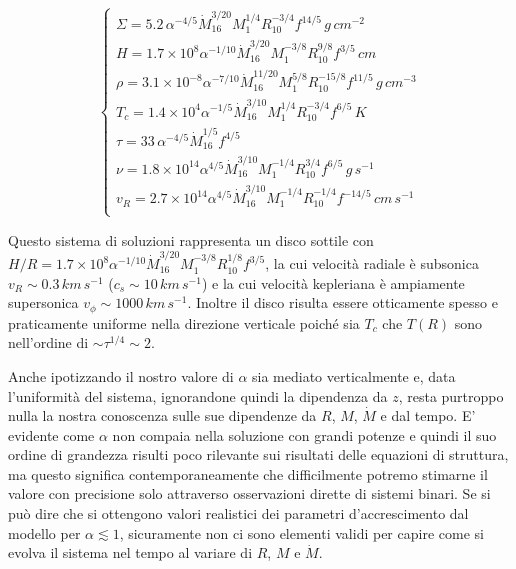 \documentclass[a4paperbi]{article}
\begin{document}
\begin{spacing}{1.3}
\begin{equation}
	\begin{cases}
		\Sigma=5.2\,\alpha^{-4/5}\dot{M}_{16}^{3/20}M^{1/4}_1R_{10}^{-3/4}f^{14/5}\,g\,cm^{-2}\\
		H=1.7\times10^8\alpha^{-1/10}\dot{M}^{3/20}_{16}M^{-3/8}_1R_{10}^{9/8}f^{3/5}\,cm\\
		\rho=3.1\times10^{-8}\alpha^{-7/10}\dot{M}^{11/20}_{16}M^{5/8}_1R_{10}^{-15/8}f^{11/5}\,g\,cm^{-3}\\
		T_c=1.4\times10^{4}\alpha^{-1/5}\dot{M}^{3/10}_{16}M^{1/4}_1R_{10}^{-3/4}f^{6/5}\,K\\
		\tau=33\,\alpha^{-4/5}\dot{M}^{1/5}_{16}f^{4/5}\\
		\nu=1.8\times10^{14}\alpha^{4/5}\dot{M}^{3/10}_{16}M^{-1/4}_1R_{10}^{3/4}f^{6/5}\,g\,s^{-1}\\
		v_R=2.7\times10^{14}\alpha^{4/5}\dot{M}^{3/10}_{16}M^{-1/4}_1R_{10}^{-1/4}f^{-14/5}\,cm\,s^{-1}\\
	\end{cases}
\end{equation}
\end{spacing}

	Questo sistema di soluzioni rappresenta un disco sottile con \\$H/R=1.7\times10^8\alpha^{-1/10}\dot{M}^{3/20}_{16}M^{-3/8}_1R_{10}^{1/8}f^{3/5}$, la cui velocità radiale è subsonica $v_R\sim 0.3\,km\,s^{-1}$ ($c_s\sim10\,km\,s^{-1}$) e la cui velocità kepleriana è ampiamente supersonica $v_\phi\sim1000\,km\,s^{-1}$. Inoltre il disco risulta essere otticamente spesso e praticamente uniforme nella direzione verticale poiché sia $T_c$ che $T(R)$ sono nell'ordine di $\sim\tau^{1/4}\sim2$.

	Anche ipotizzando il nostro valore di $\alpha$ sia mediato verticalmente e, data l'uniformità del sistema, ignorandone quindi la dipendenza da $z$, resta purtroppo nulla la nostra conoscenza sulle sue dipendenze da $R$, $M$, $\dot{M}$ e dal tempo.
	E' evidente come $\alpha$ non compaia nella soluzione con grandi potenze e quindi il suo ordine di grandezza risulti poco rilevante sui risultati delle equazioni di struttura, ma questo significa contemporaneamente che difficilmente potremo stimarne il valore con precisione solo attraverso osservazioni dirette di sistemi binari. 	
	Se si può dire che si ottengono valori realistici dei parametri d'accrescimento dal modello per $\alpha\lesssim1$, sicuramente non ci sono elementi validi per capire come si evolva il sistema nel tempo al variare di $R$, $M$ e $\dot{M}$.
	
\end{document}

